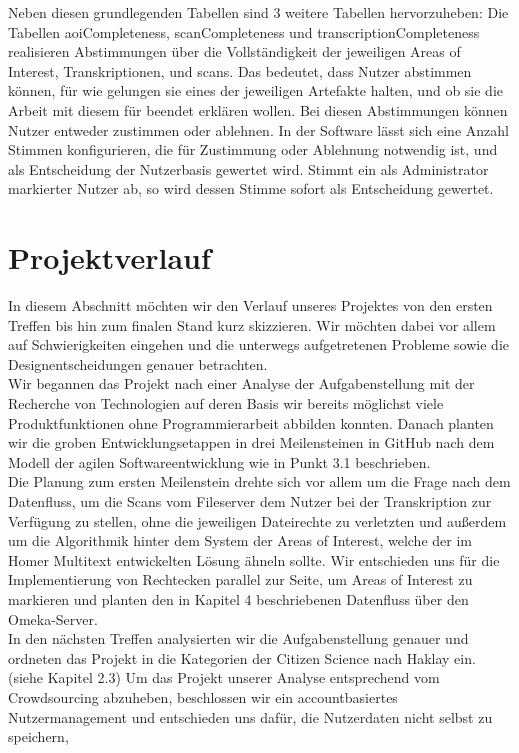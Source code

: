 \documentclass{article}
\begin{document}
Neben diesen grundlegenden Tabellen sind 3 weitere Tabellen hervorzuheben:
Die Tabellen aoiCompleteness, scanCompleteness und transcriptionCompleteness
realisieren Abstimmungen über die Vollständigkeit der jeweiligen Areas of Interest, Transkriptionen, und scans.
Das bedeutet, dass Nutzer abstimmen können,
für wie gelungen sie eines der jeweiligen Artefakte halten,
und ob sie die Arbeit mit diesem für beendet erklären wollen.
Bei diesen Abstimmungen können Nutzer entweder zustimmen oder ablehnen.
In der Software lässt sich eine Anzahl Stimmen konfigurieren,
die für Zustimmung oder Ablehnung notwendig ist,
und als Entscheidung der Nutzerbasis gewertet wird.
Stimmt ein als Administrator markierter Nutzer ab,
so wird dessen Stimme sofort als Entscheidung gewertet.

\section{Projektverlauf}
In diesem Abschnitt möchten wir den Verlauf unseres Projektes von den ersten Treffen bis hin zum finalen Stand kurz skizzieren.
Wir möchten dabei vor allem auf Schwierigkeiten eingehen und die unterwegs aufgetretenen Probleme sowie die Designentscheidungen genauer betrachten. \\
Wir begannen das Projekt nach einer Analyse der Aufgabenstellung mit der Recherche von Technologien auf deren Basis wir bereits möglichst viele Produktfunktionen ohne Programmierarbeit abbilden konnten.
Danach planten wir die groben Entwicklungsetappen in drei Meilensteinen in GitHub nach dem Modell der agilen Softwareentwicklung wie in Punkt 3.1 beschrieben.\\
Die Planung zum ersten Meilenstein drehte sich vor allem um die Frage nach dem Datenfluss, um die Scans vom Fileserver dem Nutzer bei der Transkription zur Verfügung zu stellen, 
ohne die jeweiligen Dateirechte zu verletzten und außerdem um die Algorithmik hinter dem System der Areas of Interest, welche der im Homer Multitext entwickelten Lösung ähneln sollte. 
Wir entschieden uns für die Implementierung von Rechtecken parallel zur Seite, 
um Areas of Interest zu markieren und planten den in Kapitel 4 beschriebenen Datenfluss über den Omeka-Server.\\
In den nächsten Treffen analysierten wir die Aufgabenstellung genauer und ordneten das Projekt in die Kategorien der Citizen Science nach Haklay ein. (siehe Kapitel 2.3) 
Um das Projekt unserer Analyse entsprechend vom Crowdsourcing abzuheben, beschlossen wir ein accountbasiertes Nutzermanagement und entschieden uns dafür, die Nutzerdaten nicht selbst zu speichern,
\end{document}
